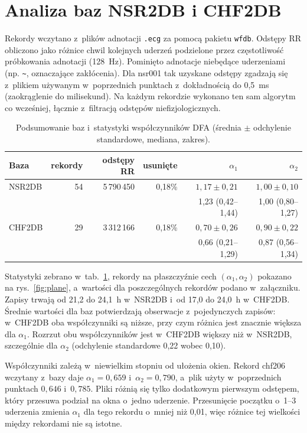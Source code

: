 \documentclass[11pt,a4paper]{article}
\begin{document}
\section{Analiza baz NSR2DB i CHF2DB}
Rekordy wczytano z~plików adnotacji \texttt{.ecg} za pomocą pakietu \texttt{wfdb}. Odstępy RR obliczono jako różnice chwil kolejnych uderzeń podzielone przez częstotliwość próbkowania adnotacji (128~Hz). Pominięto adnotacje niebędące uderzeniami (np. \texttt{\textasciitilde}, oznaczające zakłócenia). Dla nsr001 tak uzyskane odstępy zgadzają się z~plikiem używanym w~poprzednich punktach z~dokładnością do 0,5~ms (zaokrąglenie do milisekund). Na każdym rekordzie wykonano ten sam algorytm co wcześniej, łącznie z~filtracją odstępów niefizjologicznych.

\begin{table}[ht]
  \centering
  \caption{Podsumowanie baz i~statystyki współczynników DFA (średnia $\pm$ odchylenie standardowe, mediana, zakres).}
  \label{tab:db}
  \begin{tabular}{lrrrrr}
    \toprule
    Baza & rekordy & odstępy RR & usunięte & $\alpha_1$ & $\alpha_2$ \\
    \midrule
    NSR2DB & 54 & 5\,790\,450 & 0,18\% & $1{,}17 \pm 0{,}21$ & $1{,}00 \pm 0{,}10$ \\
           &    &             &        & 1,23 (0,42--1,44) & 1,00 (0,80--1,27) \\
    \midrule
    CHF2DB & 29 & 3\,312\,166 & 0,18\% & $0{,}70 \pm 0{,}26$ & $0{,}90 \pm 0{,}22$ \\
           &    &             &        & 0,66 (0,21--1,29) & 0,87 (0,56--1,34) \\
    \bottomrule
  \end{tabular}
\end{table}

Statystyki zebrano w~tab.~\ref{tab:db}, rekordy na płaszczyźnie cech $(\alpha_1, \alpha_2)$ pokazano na rys.~\ref{fig:plane}, a~wartości dla poszczególnych rekordów podano w~załączniku. Zapisy trwają od 21,2 do 24,1~h w~NSR2DB i~od 17,0 do 24,0~h w~CHF2DB. Średnie wartości dla baz potwierdzają obserwacje z~pojedynczych zapisów: w~CHF2DB oba współczynniki są niższe, przy czym różnica jest znacznie większa dla $\alpha_1$. Rozrzut obu współczynników jest w~CHF2DB większy niż w~NSR2DB, szczególnie dla $\alpha_2$ (odchylenie standardowe 0,22 wobec 0,10).

Współczynniki zależą w~niewielkim stopniu od ułożenia okien. Rekord chf206 wczytany z~bazy daje $\alpha_1 = 0{,}659$ i~$\alpha_2 = 0{,}790$, a~plik użyty w~poprzednich punktach $0{,}646$ i~$0{,}785$. Pliki różnią się tylko dodatkowym pierwszym odstępem, który przesuwa podział na okna o~jedno uderzenie. Przesunięcie początku o~1--3 uderzenia zmienia $\alpha_1$ dla tego rekordu o~mniej niż 0,01, więc różnice tej wielkości między rekordami nie są istotne.
\end{document}
